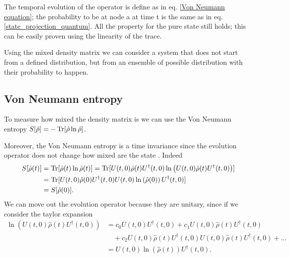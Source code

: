 The temporal evolution of the operator is define as in eq. \eqref{Von Neumann equation}; the probability to be at node a at time t is the same as in eq. \eqref{state_projection_quantum}. All the property for the pure state still holds; this can be easily proven using the linearity of the trace.

Using the mixed density matrix we can consider a system that does not start from a defined distribution, but from an ensemble of possible distribution with their probability to happen. 

\subsection{Von Neumann entropy}
To measure how mixed the density matrix is we can use the Von Neumann entropy $S[\hat\rho]=-\operatorname{Tr}[\hat\rho\ln\hat\rho]$.

Moreover, the Von Neumann entropy is a time invariance since the evolution operator does not change how mixed are the state \cite{Nielsen_Chuang_2010}. Indeed
\begin{equation}
    \begin{split}
        S[\hat\rho(t)] &=\operatorname{Tr}[\hat\rho(t)\ln\hat\rho(t)]= \operatorname{Tr}[U(t,0)\hat\rho(t)U^\dagger(t,0)\ln\left(U(t,0)\hat\rho(t)U^\dagger(t,0)\right)]\\
        &=\operatorname{Tr}[U(t,0)\hat\rho(0)U^\dagger(t,0)U(t,0)\ln\left(\hat\rho(0)\right)U^\dagger(t,0)]\\
        &= S[\hat\rho(0)].
    \end{split}
\end{equation}
We can move out the evolution operator because they are unitary, since if we consider the taylor expansion
\begin{equation}
    \begin{split}
        \ln\left(U(t,0)\hat\rho(t)U^\dagger(t,0)\right) &= c_0U(t,0)U^\dagger(t,0) + c_1 U(t,0)\hat\rho(t)U^\dagger(t,0)\\
        & \quad + c_2 U(t,0)\hat\rho(t)U^\dagger(t,0)U(t,0)\hat\rho(t)U^\dagger(t,0) + ... \\
        &=  U(t,0)\ln\left(\hat\rho(t)\right) U^\dagger(t,0).
    \end{split}
\end{equation}

\begin{comment}
If we consider the system in contact with a thermal bath with which exchange only energy but conserving it in average, namely the canonical condition hold, there is a stationary state $\hat\rho = e^{-\beta \hat L}$ that maximize the entropy. The parameter $\beta$ is just the inverse of a pseudo-temperature that stands for the interaction with the thermal bath. 
Since the thermal bath actively changes the entries of $\hat L$, it is changing the weight of the network and the probability to move from node $i$ to $j$. Thus, we are considering a network that is changing randomly by time. 
The reader can recognize that this density matrix is the same the De Domenico has introduced \eqref{density_matrix}.
\end{comment}

